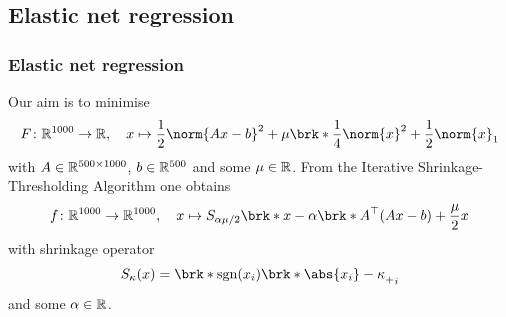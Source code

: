 %
%
%		
%
%
%		

\subsection{Elastic net regression}

\begin{frame}
	\frametitle{Elastic net regression}
	Our aim is to minimise
	\begin{align*}
		F\colon \R^{1000}\to \R, \quad x\mapsto \frac{1}{2}\norm{Ax-b}^2+\mu\brk*{\frac{1}{4}\norm{x}^2+\frac{1}{2}\norm{x}_1}
	\end{align*}
	with $A\in\mathbb{R}^{500\times 1000}$, $b\in\mathbb{R}^{500}$ and some $\mu\in\mathbb{R}$. From the Iterative Shrinkage-Thresholding Algorithm one obtains
	\begin{align*}
		f\colon\R^{1000}\to\R^{1000}, \quad x\mapsto S_{\alpha\mu/2}\brk*{x-\alpha\brk*{A^\top(Ax-b)+\frac{\mu}{2}x}}
	\end{align*}
	with shrinkage operator
	\begin{align*}
		S_\kappa(x) = \brk*{\sgn(x_i)\brk*{\abs{x_i}-\kappa}_+}_i
	\end{align*}
	and some $\alpha\in\mathbb{R}$.
\end{frame}


